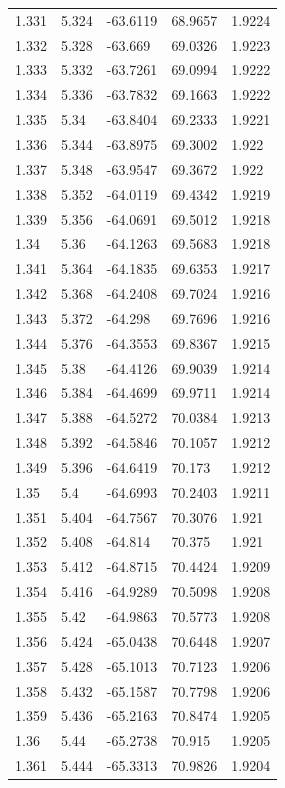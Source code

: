 \begin{tabular}{lllll}
1.331 & 5.324 & -63.6119 & 68.9657 & 1.9224 \\
1.332 & 5.328 & -63.669 & 69.0326 & 1.9223 \\
1.333 & 5.332 & -63.7261 & 69.0994 & 1.9222 \\
1.334 & 5.336 & -63.7832 & 69.1663 & 1.9222 \\
1.335 & 5.34 & -63.8404 & 69.2333 & 1.9221 \\
1.336 & 5.344 & -63.8975 & 69.3002 & 1.922 \\
1.337 & 5.348 & -63.9547 & 69.3672 & 1.922 \\
1.338 & 5.352 & -64.0119 & 69.4342 & 1.9219 \\
1.339 & 5.356 & -64.0691 & 69.5012 & 1.9218 \\
1.34 & 5.36 & -64.1263 & 69.5683 & 1.9218 \\
1.341 & 5.364 & -64.1835 & 69.6353 & 1.9217 \\
1.342 & 5.368 & -64.2408 & 69.7024 & 1.9216 \\
1.343 & 5.372 & -64.298 & 69.7696 & 1.9216 \\
1.344 & 5.376 & -64.3553 & 69.8367 & 1.9215 \\
1.345 & 5.38 & -64.4126 & 69.9039 & 1.9214 \\
1.346 & 5.384 & -64.4699 & 69.9711 & 1.9214 \\
1.347 & 5.388 & -64.5272 & 70.0384 & 1.9213 \\
1.348 & 5.392 & -64.5846 & 70.1057 & 1.9212 \\
1.349 & 5.396 & -64.6419 & 70.173 & 1.9212 \\
1.35 & 5.4 & -64.6993 & 70.2403 & 1.9211 \\
1.351 & 5.404 & -64.7567 & 70.3076 & 1.921 \\
1.352 & 5.408 & -64.814 & 70.375 & 1.921 \\
1.353 & 5.412 & -64.8715 & 70.4424 & 1.9209 \\
1.354 & 5.416 & -64.9289 & 70.5098 & 1.9208 \\
1.355 & 5.42 & -64.9863 & 70.5773 & 1.9208 \\
1.356 & 5.424 & -65.0438 & 70.6448 & 1.9207 \\
1.357 & 5.428 & -65.1013 & 70.7123 & 1.9206 \\
1.358 & 5.432 & -65.1587 & 70.7798 & 1.9206 \\
1.359 & 5.436 & -65.2163 & 70.8474 & 1.9205 \\
1.36 & 5.44 & -65.2738 & 70.915 & 1.9205 \\
1.361 & 5.444 & -65.3313 & 70.9826 & 1.9204 \\

\end{tabular}
